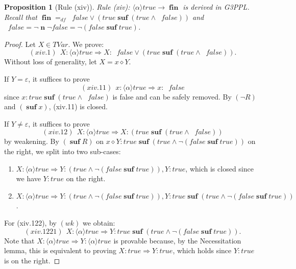 \documentclass[manuscript,screen]{acmart}
\newtheorem{prop}{Proposition}[section]
\newcommand{\la}[0]{\langle}
\newcommand{\ra}[0]{\rangle}
\newcommand{\dddef}[0]{=_{df}}
\newcommand{\true}[0]{\mathit{true}}
\newcommand{\false}[0]{\mathit{false}}
\newcommand{\cat}[0]{\diamond}
\newcommand{\GiiiPPLcyc}[0]{\mbox{G3PPL}}
\DeclareMathOperator{\osuf}{\mathbf{suf}}
\newcommand{\TVar}[0]{\textit{TVar}}
\DeclareMathOperator{\nxt}{\mathbf{n}}
\DeclareMathOperator{\bnxt}{\bar{\nxt}}
\DeclareMathOperator{\fin}{\mathbf{fin}}
\begin{document}
\begin{prop}[Rule (xiv)]
Rule (xiv): 
$\la\alpha\ra\true \rightarrow \fin$
is derived in \GiiiPPLcyc. Recall that $\fin\dddef \bnxt \false \vee (\true\osuf(\true\wedge\bnxt \false))$ and $\bnxt \false = \neg \nxt \neg \false = \neg (\false\osuf \true)$. 
\end{prop}

\begin{proof}
Let $X\in \TVar$. We prove:
$$
(xiv.1)\ \ X : \la\alpha\ra\true \Rightarrow X : \bnxt \false \vee (\true\osuf(\true\wedge\bnxt \false)).
$$
Without loss of generality, let $X = x\cat Y$. 

If $Y = \varepsilon$, it suffices to prove 
$$
(xiv.11)\ \ x : \la\alpha\ra\true\Rightarrow x : \bnxt\false
$$
since $x : \true\osuf(\true\wedge\bnxt \false)$ is false and can be safely removed. 
By $(\neg R)$ and $(\osuf x)$, (xiv.11) is closed. 

If $Y\neq \varepsilon$, it suffices to prove
$$
(xiv.12)\ \ X : \la\alpha\ra\true \Rightarrow X : (\true\osuf(\true\wedge\bnxt \false))
$$
by weakening. 
By $(\osuf R)$ on $x\cat Y : \true\osuf(\true\wedge\neg(\false\osuf\true))$ on the right, we split into two sub-cases:
\begin{enumerate}
    \item[(xiv.121)] $X : \la\alpha\ra\true\Rightarrow Y : (\true\wedge\neg(\false\osuf\true)), Y : \true$, which is closed since we have $Y : \true$ on the right.
    \item[(xiv.122)] $X : \la\alpha\ra\true\Rightarrow Y : (\true\wedge\neg(\false\osuf\true)), Y : \true\osuf(\true\wedge\neg(\false\osuf\true))$.
\end{enumerate}

For (xiv.122), by $(wk)$ we obtain:
$$
(xiv.1221)\ \ X : \la\alpha\ra\true\Rightarrow Y : \true\osuf(\true\wedge\neg(\false\osuf\true)). 
$$
Note that $X : \la\alpha\ra\true\Rightarrow Y : \la\alpha\ra \true$ is provable because, by the Necessitation lemma, this is equivalent to proving $X : \true\Rightarrow Y : \true$, which holds since $Y : \true$ is on the right. 


\end{proof}
\end{document}
